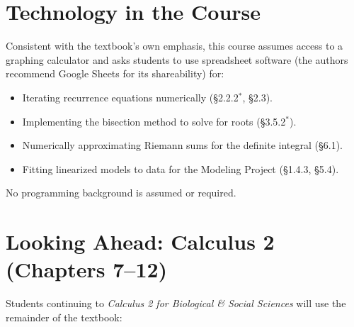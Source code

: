 \documentclass[11pt]{article}
\newcommand{\opt}{$^{\ast}$}
\begin{document}
\section{Technology in the Course}

Consistent with the textbook's own emphasis, this course assumes access to a graphing
calculator and asks students to use spreadsheet software (the authors recommend Google
Sheets for its shareability) for:
\begin{itemize}
\item Iterating recurrence equations numerically (\S2.2.2\opt, \S2.3).
\item Implementing the bisection method to solve for roots (\S3.5.2\opt).
\item Numerically approximating Riemann sums for the definite integral (\S6.1).
\item Fitting linearized models to data for the Modeling Project (\S1.4.3, \S5.4).
\end{itemize}
No programming background is assumed or required.

\newpage
\appendix
\section{Looking Ahead: Calculus 2 (Chapters 7--12)}
\label{app:calc2}

Students continuing to \emph{Calculus 2 for Biological \& Social Sciences} will use the
remainder of the textbook:
\end{document}
